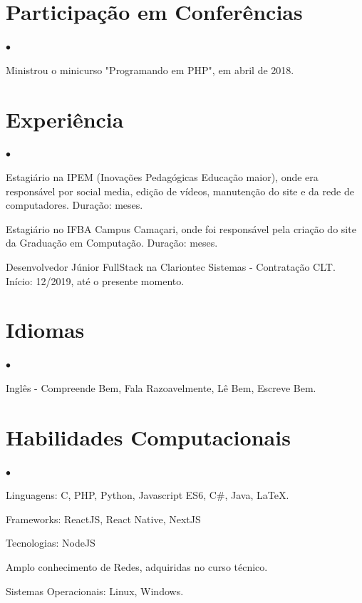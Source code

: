 \documentclass[margin,line]{res}
\newenvironment{list2}{
 \begin{list}{$\bullet$}{%
     \setlength{\itemsep}{0in}
     \setlength{\parsep}{0in} \setlength{\parskip}{0in}
     \setlength{\topsep}{0in} \setlength{\partopsep}{0in}
     \setlength{\leftmargin}{0.2in}}}{\end{list}}
\begin{document}
\begin{resume}
\section{Participação em Conferências}
\begin{list2}
\item Ministrou o minicurso "Programando em PHP", em abril de 2018.
\end{list2}
\vspace{0.2cm}
\section{Experiência}
\begin{list2}
\item Estagiário na IPEM (Inovações Pedagógicas Educação maior), onde era responsável por social media, edição de vídeos, manutenção do site e da rede de computadores. Duração: meses.

\item Estagiário no IFBA Campus Camaçari, onde foi responsável pela criação do site da Graduação em Computação. Duração: meses.

\item Desenvolvedor Júnior FullStack na Clariontec Sistemas - Contratação CLT. Início: 12/2019, até o presente momento.
\end{list2}
\vspace{0.2cm}
\section{Idiomas}
\begin{list2}
\item Inglês - Compreende Bem, Fala Razoavelmente, Lê Bem, Escreve Bem.
\end{list2}
\vspace{0.2cm}
\section{Habilidades Computacionais}
\begin{list2}
\item Linguagens: C, PHP, Python, Javascript ES6, C\#, Java, \LaTeX.
\item Frameworks: ReactJS, React Native, NextJS
\item Tecnologias: NodeJS
\item Amplo conhecimento de Redes, adquiridas no curso técnico.
\item Sistemas Operacionais: Linux, Windows.
\end{list2}
\end{resume}
\end{document}
